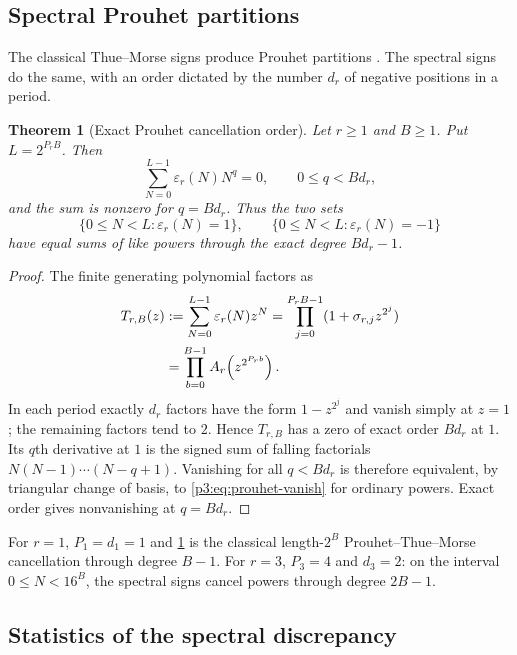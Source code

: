 \documentclass[11pt,oneside]{article}
\newtheorem{theorem}{Theorem}[section]
\theoremstyle{definition}
\theoremstyle{remark}
\begin{document}
\subsection{Spectral Prouhet partitions}

The classical Thue--Morse signs produce Prouhet partitions \cite{p3:allouche-shallit-1999,p3:automatic-sequences}.  The spectral signs do the same, with an order dictated by the number $d_r$ of negative positions in a period.

\begin{theorem}[Exact Prouhet cancellation order]\label{p3:thm:prouhet-r}
Let $r\ge1$ and $B\ge1$.  Put $L=2^{P_rB}$.  Then
\begin{equation}\label{p3:eq:prouhet-vanish}
 \sum_{N=0}^{L-1}\varepsilon_r(N)N^q=0,
 \qquad 0\le q<Bd_r,
\end{equation}
and the sum is nonzero for $q=Bd_r$.  Thus the two sets
\[
 \{0\le N<L:\varepsilon_r(N)=1\},
 \qquad
 \{0\le N<L:\varepsilon_r(N)=-1\}
\]
have equal sums of like powers through the exact degree $Bd_r-1$.
\end{theorem}

\begin{proof}
The finite generating polynomial factors as
\begin{align}
 T_{r,B}(z)
 &:=\sum_{N=0}^{L-1}\varepsilon_r(N)z^N
 =\prod_{j=0}^{P_rB-1}(1+\sigma_{r,j}z^{2^j})\notag\\
 &=\prod_{b=0}^{B-1}A_r\!\left(z^{2^{P_rb}}\right).\label{p3:eq:finite-prouhet-product}
\end{align}
In each period exactly $d_r$ factors have the form $1-z^{2^j}$ and vanish simply at $z=1$; the remaining factors tend to $2$.  Hence $T_{r,B}$ has a zero of exact order $Bd_r$ at $1$.  Its $q$th derivative at $1$ is the signed sum of falling factorials $N(N-1)\cdots(N-q+1)$.  Vanishing for all $q<Bd_r$ is therefore equivalent, by triangular change of basis, to \eqref{p3:eq:prouhet-vanish} for ordinary powers.  Exact order gives nonvanishing at $q=Bd_r$.
\end{proof}

\begin{example}
For $r=1$, $P_1=d_1=1$ and \cref{p3:thm:prouhet-r} is the classical length-$2^B$ Prouhet--Thue--Morse cancellation through degree $B-1$.  For $r=3$, $P_3=4$ and $d_3=2$: on the interval $0\le N<16^B$, the spectral signs cancel powers through degree $2B-1$.
\end{example}

\subsection{Statistics of the spectral discrepancy}
\end{document}
